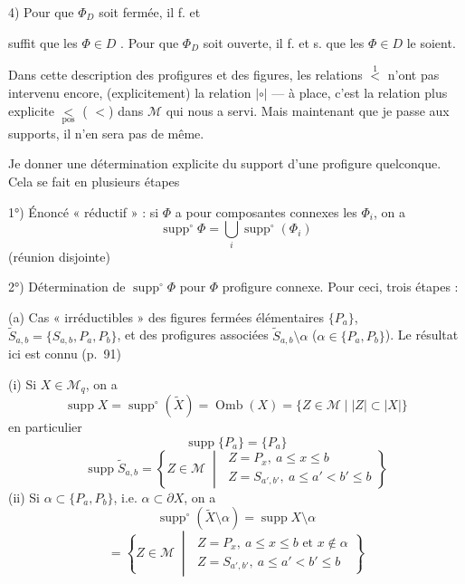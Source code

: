 \documentclass[11pt,a4paper]{article}
\begin{document}
4) Pour que $\Phi_D$ soit fermée, il f. et

suffit que les $\Phi\in D$  . Pour que $\Phi_D$ soit ouverte, il f. et s. que les $\Phi\in D$ le soient.


Dans cette description des profigures et des figures, les relations $\overset{1}{<}$ n'ont pas intervenu encore,  (explicitement) la relation $|{\circ}|$ — à  place, c'est la relation plus explicite $\underset{\mathrm{pos}}{<}$ ( $<$) dans $\mathcal{M}$ qui nous a servi. Mais maintenant que je passe aux supports, il n'en sera pas de même.

Je  \struck{\ill{}} donner une détermination explicite du support d'une profigure quelconque. Cela se fait en plusieurs étapes

1°) Énoncé « réductif » : si  $\Phi$ a pour composantes connexes les $\Phi_i$, on a
\[ \operatorname{supp}^\circ\Phi = \bigcup_i \operatorname{supp}^\circ(\Phi_i) \]
(réunion disjointe)

2°) Détermination de $\operatorname{supp}^\circ\Phi$ pour $\Phi$ profigure connexe. Pour ceci, trois étapes :

(a) Cas « irréductibles » des figures fermées élémentaires $\{P_a\}$, $\widetilde{S}_{a,b}=\{S_{a,b},P_a,P_b\}$, et des profigures associées $\widetilde{S}_{a,b}\setminus\alpha$ ($\alpha\in\{P_a,P_b\}$). Le résultat ici est connu (p.~91)


(i) Si $X\in\mathcal{M}_q$, on a
\[ \operatorname{supp}X = \operatorname{supp}^\circ(\widetilde{X}) = \operatorname{Omb}(X) = \{Z\in\mathcal{M} \mid |Z|\subset|X|\} \]
en particulier
\[ \operatorname{supp}\{P_a\} = \{P_a\} \]
\[ \operatorname{supp}\widetilde{S}_{a,b} = \left\{Z\in\mathcal{M} \;\middle|\;
\begin{array}{l} Z=P_x,\ a\leq x\leq b \\ Z=S_{a',b'},\ a\leq a'<b'\leq b \end{array}\right\} \]
(ii) Si  $\alpha\subset\{P_a,P_b\}$, i.e. $\alpha\subset\partial X$, on a
\[ \operatorname{supp}^\circ(\widetilde{X}\setminus\alpha) = \operatorname{supp}X\setminus\alpha \]
\[ = \left\{Z\in\mathcal{M} \;\middle|\;
\begin{array}{l} Z=P_x,\ a\leq x\leq b \text{ et } x\notin\alpha \\ Z=S_{a',b'},\ a\leq a'<b'\leq b \end{array}\right\} \]
\end{document}
